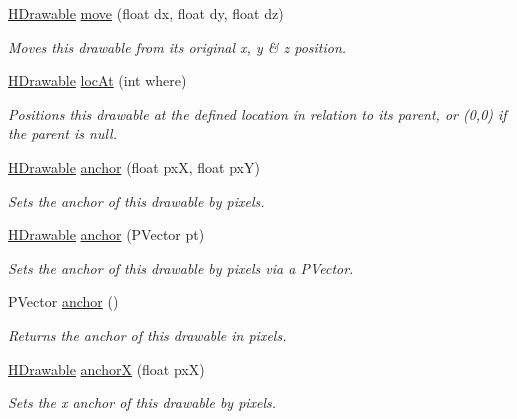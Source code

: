 \begin{DoxyCompactItemize}
\hyperlink{classhype_1_1core_1_1drawable_1_1_h_drawable}{H\-Drawable} \hyperlink{classhype_1_1core_1_1drawable_1_1_h_drawable_ac245654fba5be06dec5e18ef06dbc743}{move} (float dx, float dy, float dz)
\begin{DoxyCompactList}\small\item\em Moves this drawable from its original x, y \& z position. \end{DoxyCompactList}\item 
\hyperlink{classhype_1_1core_1_1drawable_1_1_h_drawable}{H\-Drawable} \hyperlink{classhype_1_1core_1_1drawable_1_1_h_drawable_aef563dc604bba62673085b2e50764c5c}{loc\-At} (int where)
\begin{DoxyCompactList}\small\item\em Positions this drawable at the defined location in relation to its parent, or (0,0) if the parent is null. \end{DoxyCompactList}\item 
\hyperlink{classhype_1_1core_1_1drawable_1_1_h_drawable}{H\-Drawable} \hyperlink{classhype_1_1core_1_1drawable_1_1_h_drawable_a4b76d63f6e548518b3d5fe8a5b145dd9}{anchor} (float px\-X, float px\-Y)
\begin{DoxyCompactList}\small\item\em Sets the anchor of this drawable by pixels. \end{DoxyCompactList}\item 
\hyperlink{classhype_1_1core_1_1drawable_1_1_h_drawable}{H\-Drawable} \hyperlink{classhype_1_1core_1_1drawable_1_1_h_drawable_afedf363205416ae3a7fe1ff9b8e38394}{anchor} (P\-Vector pt)
\begin{DoxyCompactList}\small\item\em Sets the anchor of this drawable by pixels via a P\-Vector. \end{DoxyCompactList}\item 
P\-Vector \hyperlink{classhype_1_1core_1_1drawable_1_1_h_drawable_af89cf8769d4086618f8d07f515e200b6}{anchor} ()
\begin{DoxyCompactList}\small\item\em Returns the anchor of this drawable in pixels. \end{DoxyCompactList}\item 
\hyperlink{classhype_1_1core_1_1drawable_1_1_h_drawable}{H\-Drawable} \hyperlink{classhype_1_1core_1_1drawable_1_1_h_drawable_aa0e5156663b032cb4d4b5fe446d4a39d}{anchor\-X} (float px\-X)
\begin{DoxyCompactList}\small\item\em Sets the x anchor of this drawable by pixels. \end{DoxyCompactList}\item 

\end{DoxyCompactItemize}
